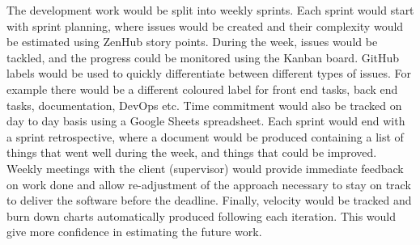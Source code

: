 The development work would be split into weekly sprints. Each sprint would start with sprint
planning, where issues would be created and their complexity would be estimated using ZenHub
story points. During the week, issues would be tackled, and the progress could be monitored using
the Kanban board. GitHub labels would be used to quickly differentiate between different types
of issues. For example there would be a different coloured label for front end tasks, back end
tasks, documentation, DevOps etc. Time commitment would also be tracked on day to day basis
using a Google Sheets spreadsheet\cite{33}. Each sprint would end with a sprint retrospective, where
a document would be produced containing a list of things that went well during the week, and things
that could be improved. Weekly meetings with the client (supervisor) would provide immediate feedback
on work done and allow re-adjustment of the approach necessary to stay on track to deliver the
software before the deadline. Finally, velocity would be tracked and burn down charts automatically
produced following each iteration. This would give more confidence in estimating the future work.


